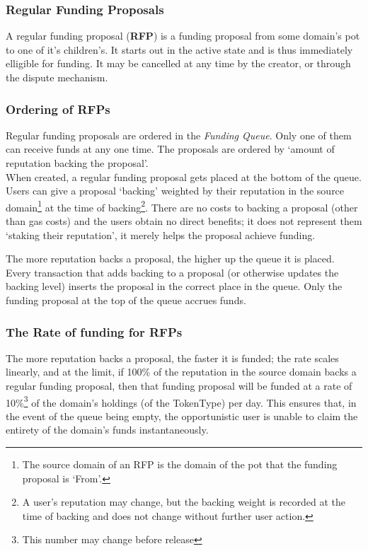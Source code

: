 \subsubsection{Regular Funding Proposals}
A regular funding proposal (\textbf{RFP}) is a funding proposal from some domain's pot to one of it's children's. It starts out in the active state and is thus immediately elligible for funding. It may be cancelled at any time by the creator, or through the dispute mechanism.

\subsubsection*{Ordering of RFPs}
Regular funding proposals are ordered in the \emph{Funding Queue}. Only one of them can receive funds at any one time. The proposals are ordered by `amount of reputation backing the proposal'.\\
When created, a regular funding proposal gets placed at the bottom of the queue. Users can give a proposal `backing' weighted by their reputation in the source domain\footnote{The source domain of an RFP is the domain of the pot that the funding proposal is `From'.} at the time of backing\footnote{A user's reputation may change, but the backing weight is recorded at the time of backing and does not change without further user action.}. There are no costs to backing a proposal (other than gas costs) and the users obtain no direct benefits; it does not represent them `staking their reputation', it merely helps the proposal achieve funding.

The more reputation backs a proposal, the higher up the queue it is placed. Every transaction that adds backing to a proposal (or otherwise updates the backing level) inserts the proposal in the correct place in the queue. Only the funding proposal at the top of the queue accrues funds.\\

\subsubsection*{The Rate of funding for RFPs}
The more reputation backs a proposal, the faster it is funded; the rate scales linearly, and at the limit, if 100\% of the reputation in the source domain backs a regular funding proposal, then that funding proposal will be funded at a rate of 10\%\footnote{This number may change before release} of the domain's holdings (of the TokenType) per day. This ensures that, in the event of the queue being empty, the opportunistic user is unable to claim the entirety of the domain's funds instantaneously.

